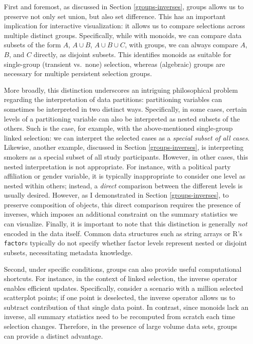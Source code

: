 \documentclass[
  openany]{book}
\theoremstyle{definition}
\theoremstyle{definition}
\theoremstyle{definition}
\theoremstyle{definition}
\theoremstyle{remark}
\begin{document}
First and foremost, as discussed in Section \ref{groups-inverses}, groups allows us to preserve not only set union, but also set difference. This has an important implication for interactive visualization: it allows us to compare selections across multiple distinct groups. Specifically, while with monoids, we can compare data subsets of the form \(A\), \(A \cup B\), \(A \cup B \cup C\), with groups, we can always compare \(A\), \(B\), and \(C\) directly, as disjoint subsets. This identifies monoids as suitable for single-group (transient vs.~none) selection, whereas (algebraic) groups are necessary for multiple persistent selection groups.

More broadly, this distinction underscores an intriguing philosophical problem regarding the interpretation of data partitions: partitioning variables can sometimes be interpreted in two distinct ways. Specifically, in some cases, certain levels of a partitioning variable can also be interpreted as nested subsets of the others. Such is the case, for example, with the above-mentioned single-group linked selection: we can interpret the selected cases as a \emph{special subset of all cases}. Likewise, another example, discussed in Section \ref{groups-inverses}, is interpreting smokers as a special subset of all study participants. However, in other cases, this nested interpretation is not appropriate. For instance, with a political party affiliation or gender variable, it is typically inappropriate to consider one level as nested within others; instead, a \emph{direct} comparison between the different levels is usually desired. However, as I demonstrated in Section \ref{groups-inverses}, to preserve composition of objects, this direct comparison requires the presence of inverses, which imposes an additional constraint on the summary statistics we can visualize. Finally, it is important to note that this distinction is generally \emph{not} encoded in the data itself. Common data structures such as string arrays or R's \texttt{factor}s typically do not specify whether factor levels represent nested or disjoint subsets, necessitating metadata knowledge.

Second, under specific conditions, groups can also provide useful computational shortcuts. For instance, in the context of linked selection, the inverse operator enables efficient updates. Specifically, consider a scenario with a million selected scatterplot points; if one point is deselected, the inverse operator allows us to subtract contribution of that single data point. In contrast, since monoids lack an inverse, all summary statistics need to be recomputed from scratch each time selection changes. Therefore, in the presence of large volume data sets, groups can provide a distinct advantage.
\end{document}
